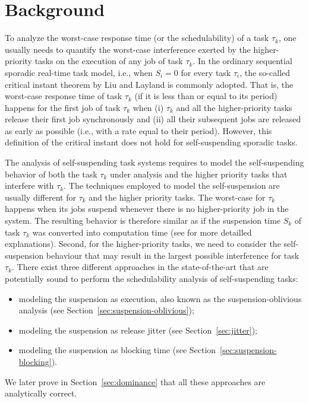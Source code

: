 \section{Background}
\label{sec:existing-analyses}

To analyze the worst-case response time (or the schedulability) of a task $\tau_k$, one usually needs to quantify the worst-case interference exerted by the higher-priority tasks on the execution of any job of task $\tau_k$. In the ordinary sequential sporadic real-time task model, i.e., when $S_i=0$ for every task $\tau_i$, the so-called critical instant theorem by Liu and Layland \cite{Liu_1973} is commonly adopted. That is, the worst-case response time of task $\tau_k$ (if it is less than or equal to its period) happens for the first job of task $\tau_k$ when (i) $\tau_k$ and all the higher-priority tasks release their first job synchronously and (ii) all their subsequent jobs are released as early as possible (i.e., with a rate equal to their period).  However,  this definition of the
critical instant does not hold for self-suspending sporadic tasks.  


The analysis of self-suspending task systems requires to model the self-suspending behavior of both the task $\tau_k$ under analysis and the higher priority tasks that interfere with $\tau_k$. The techniques employed to model the self-suspension are usually different for $\tau_k$ and the higher priority tasks. The worst-case for $\tau_k$ happens when its jobs suspend whenever there is no
higher-priority job in the system. The resulting behavior is therefore similar as if the
suspension time $S_k$ of task $\tau_k$ was converted
into computation time (see \cite{Huang_2015} for more detailled explanations). 
Second, for the higher-priority tasks,
we need to consider the self-suspension behaviour that may result in
the largest possible interference for task $\tau_k$.
There exist three different approaches in the state-of-the-art 
that are potentially sound to perform the schedulability analysis of self-suspending tasks:
\begin{itemize}
\item modeling the suspension as execution, also known as the suspension-oblivious analysis (see Section~\ref{sec:suspension-oblivious});
\item modeling the suspension as release jitter (see Section~\ref{sec:jitter});
\item modeling the suspension as blocking time (see Section~\ref{sec:suspension-blocking}).
\end{itemize}
We later prove in Section~\ref{sec:dominance} that all these approaches are analytically correct. 

